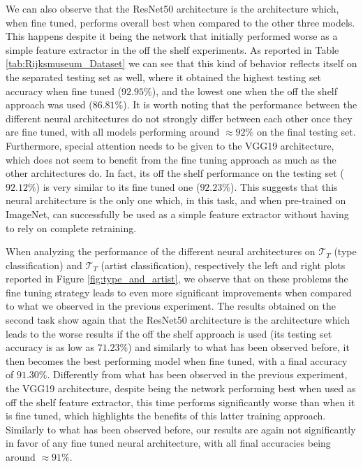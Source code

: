We can also observe that the ResNet50 architecture is the architecture which, when fine tuned, performs overall best when compared to the other three models. This happens despite it being the network that initially performed worse as a simple feature extractor in the off the shelf experiments. As reported in Table \ref{tab:Rijksmuseum_Dataset} we can see that this kind of behavior reflects itself on the separated testing set as well, where it obtained the highest testing set accuracy when fine tuned ($92.95\%$), and the lowest one when the off the shelf approach was used ($86.81\%$). It is worth noting that the performance between the different neural architectures do not strongly differ between each other once they are fine tuned, with all models performing around $\approx 92\%$ on the final testing set. Furthermore, special attention needs to be given to the VGG19 architecture, which does not seem to benefit from the fine tuning approach as much as the other architectures do. In fact, its off the shelf performance on the testing set ($92.12\%$) is very similar to its fine tuned one ($92.23\%$). This suggests that this neural architecture is the only one which, in this task, and when pre-trained on ImageNet, can successfully be used as a simple feature extractor without having to rely on complete retraining. 

When analyzing the performance of the different neural architectures on $\mathcal{T}_T$  (type classification) and $\mathcal{T}_T$  (artist classification), respectively the left and right plots reported in Figure \ref{fig:type_and_artist}, we observe that on these problems the fine tuning strategy leads to even more significant improvements when compared to what we observed in the previous experiment. The results obtained on the second task show again that the ResNet50 architecture is the architecture which leads to the worse results if the off the shelf approach is used (its testing set accuracy is as low as $71.23\%$) and similarly to what has been observed before, it then becomes the best performing model when fine tuned, with a final accuracy of $91.30\%$. Differently from what has been observed in the previous experiment, the VGG19 architecture, despite being the network performing best when used as off the shelf feature extractor, this time performs significantly worse than when it is fine tuned, which highlights the benefits of this latter training approach. Similarly to what has been observed before, our results are again not significantly in favor of any fine tuned neural architecture, with all final accuracies being around $\approx 91\%$.

